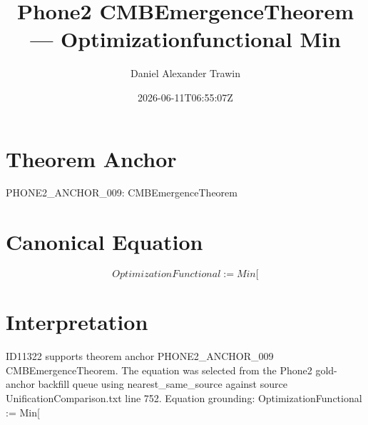 \documentclass[11pt]{article}
\title{Phone2 CMBEmergenceTheorem — Optimizationfunctional Min}
\author{Daniel Alexander Trawin}
\date{2026-06-11T06:55:07Z}
\begin{document}
\maketitle
\section*{Theorem Anchor}
PHONE2_ANCHOR_009: CMBEmergenceTheorem
\section*{Canonical Equation}
\[
OptimizationFunctional := Min[
\]
\section*{Interpretation}
ID11322 supports theorem anchor PHONE2_ANCHOR_009 CMBEmergenceTheorem. The equation was selected from the Phone2 gold-anchor backfill queue using nearest_same_source against source UnificationComparison.txt line 752. Equation grounding: OptimizationFunctional := Min[
\end{document}
